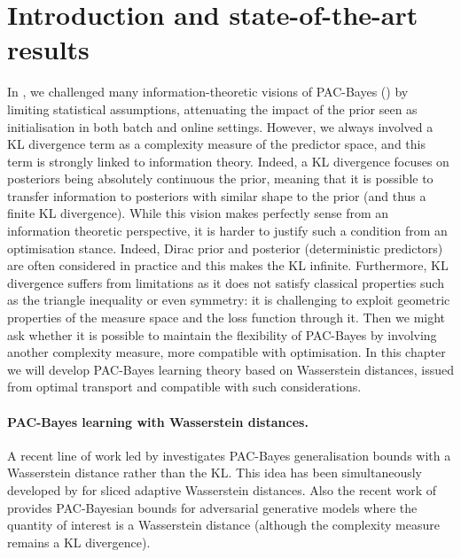 \section{Introduction and state-of-the-art results}
In , we challenged many information-theoretic visions of PAC-Bayes () by limiting statistical assumptions, attenuating the impact of the prior seen as initialisation in both batch and online settings. However, we always involved a KL divergence term as a complexity measure of the predictor space, and this term is strongly linked to information theory. Indeed, a KL divergence focuses on posteriors being absolutely continuous \wrt the prior, meaning that it is possible to transfer information to posteriors with similar shape to the prior (and thus a finite KL divergence). While this vision makes perfectly sense from an information theoretic perspective, it is harder to justify such a condition from an optimisation stance. Indeed, Dirac prior and posterior (\ie deterministic predictors) are often considered in practice and this makes the KL infinite. Furthermore, KL divergence suffers from limitations as it does not satisfy classical properties such as the triangle inequality or even symmetry: it is challenging to exploit geometric properties of the measure space and the loss function through it. Then we might ask whether it is possible to maintain the flexibility of PAC-Bayes by involving another complexity measure, more compatible with optimisation. In this chapter we will develop PAC-Bayes learning theory based on Wasserstein distances, issued from optimal transport and compatible with such considerations. 
\paragraph{PAC-Bayes learning with Wasserstein distances.}
A recent line of work led by \citet{amit2022integral} investigates PAC-Bayes generalisation bounds with a Wasserstein distance rather than the KL. This idea has been simultaneously developed by \citet{ohana2023shedding} for sliced adaptive Wasserstein distances.
Also the recent work of \citet{mbacke2023pacbayesian} provides PAC-Bayesian bounds for adversarial generative models where the quantity of interest is a Wasserstein distance (although the complexity measure remains a KL divergence).

